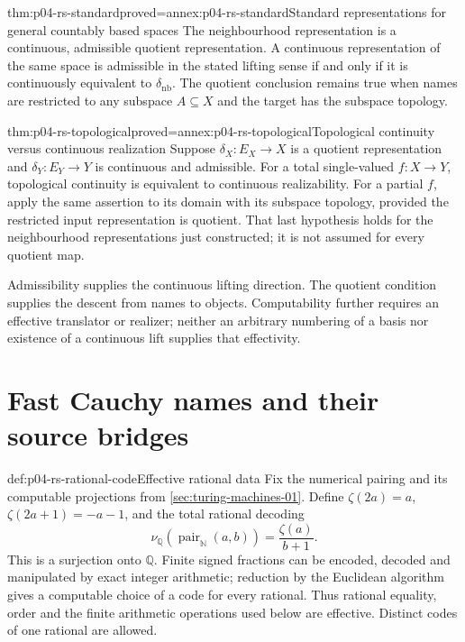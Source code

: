 \begin{hbtheorem}{thm:p04-rs-standard}{proved=annex:p04-rs-standard}{Standard representations for general countably based spaces}
The neighbourhood representation is a continuous, admissible
quotient representation. A continuous representation of the same
space is admissible in the stated lifting sense if and only if it
is continuously equivalent to \(\delta_{\mathrm{nb}}\).
The quotient conclusion remains true when names are restricted
to any subspace \(A\subseteq X\) and the target has the subspace
topology.
\end{hbtheorem}

\begin{hbtheorem}{thm:p04-rs-topological}{proved=annex:p04-rs-topological}{Topological continuity versus continuous realization}
Suppose \(\delta_X:E_X\to X\) is a quotient representation and
\(\delta_Y:E_Y\to Y\) is continuous and admissible. For a total
single-valued \(f:X\to Y\), topological continuity is equivalent
to continuous realizability. For a partial \(f\), apply the same
assertion to its domain with its subspace topology, provided the
restricted input representation is quotient.
That last hypothesis holds for the neighbourhood representations
just constructed; it is not assumed for every quotient map.
\end{hbtheorem}

Admissibility supplies the continuous lifting direction.
The quotient condition supplies the descent from names to objects.
Computability further requires an effective translator or realizer;
neither an arbitrary numbering of a basis nor existence of a
continuous lift supplies that effectivity.

\section{Fast Cauchy names and their source bridges}
\label{sec:p04-rs-cauchy}

\begin{hbdefinition}{def:p04-rs-rational-code}{Effective rational data}
Fix the numerical pairing and its computable projections from
\cref{sec:turing-machines-01}. Define
\(\zeta(2a)=a\), \(\zeta(2a+1)=-a-1\), and the total rational
decoding
\[
 \nu_{\mathbb Q}(\operatorname{pair}_{\mathbb N}(a,b))
 =\frac{\zeta(a)}{b+1}.
\]
This is a surjection onto \(\mathbb Q\).
Finite signed fractions can be encoded, decoded and manipulated
by exact integer arithmetic; reduction by the Euclidean algorithm
gives a computable choice of a code for every rational.
Thus rational equality, order and the finite arithmetic operations
used below are effective. Distinct codes of one rational are allowed.
\end{hbdefinition}

